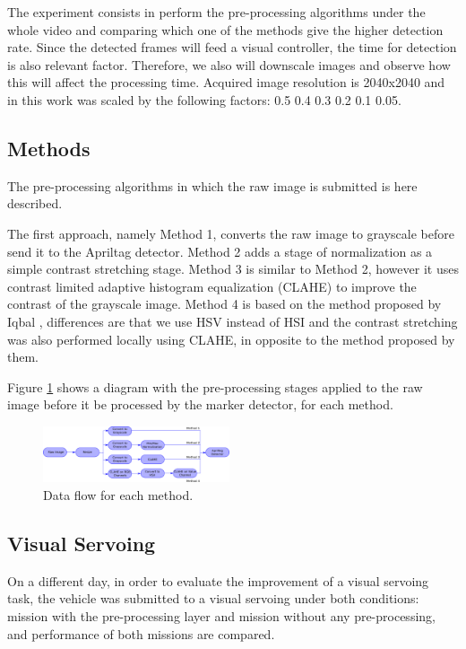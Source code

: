 \documentclass[conference, letterpaper]{IEEEtran}
\begin{document}
The experiment consists in perform the pre-processing algorithms under the
whole video and comparing which one of the methods give the higher detection
rate. Since the detected frames will feed a visual controller, the time for
detection is also relevant factor. Therefore, we also will downscale images and
observe how this will affect the processing time. Acquired image resolution is
2040x2040 and in this work was scaled by the following factors: 0.5 0.4 0.3 0.2
0.1 0.05.

\subsection{Methods}

The pre-processing algorithms in which the raw image is submitted is here described. 

The first approach, namely Method 1, converts the raw image to grayscale
before send it to the Apriltag detector.  Method 2 adds a stage of
normalization as a simple contrast stretching stage.  Method 3 is similar to
Method 2, however it uses contrast limited adaptive histogram equalization (CLAHE)
\cite{zuiderveld1994contrast} to improve the contrast of the grayscale image.
Method 4 is based on the method proposed by Iqbal \cite{iqbal2007underwater},
differences are that we use HSV instead of HSI and the contrast stretching was
also performed locally  using CLAHE, in opposite to the method proposed by
them.

Figure \ref{fig:methods_flow} shows a diagram with the pre-processing stages
applied to the raw image before it be processed by the marker detector, for each
method. 

\begin{figure}[!htpb]
    \centering
    \includegraphics[width=0.49\textwidth]{./fig/processing_flow2.png}
    \caption{Data flow for each method.}
    \label{fig:methods_flow}
\end{figure}


\subsection{Visual Servoing}

On a different day, in order to evaluate the improvement of a visual servoing
task, the vehicle was submitted to a visual servoing under both conditions:
mission with the pre-processing layer and mission without any pre-processing,
and performance of both missions are compared.
\end{document}
